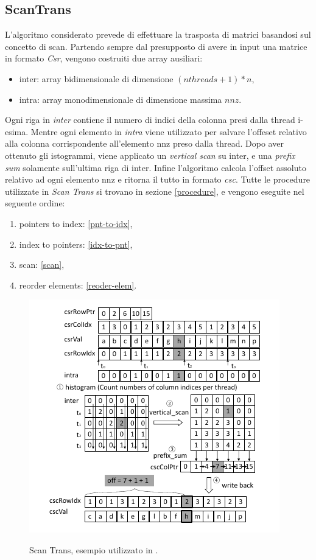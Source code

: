 \documentclass[]{IEEEtran}
\begin{document}
	\subsection{ScanTrans}
	L'algoritmo considerato prevede di effettuare la trasposta di matrici basandosi sul concetto di scan. Partendo sempre dal presupposto di avere in input una matrice in formato \textit{Csr}, vengono costruiti due array ausiliari:
	\begin{itemize}
		\item inter: array bidimensionale di dimensione $ (nthreads+1) * n $,
		\item intra: array monodimensionale di dimensione massima $ nnz $.
	\end{itemize}
	Ogni riga in \textit{inter} contiene il numero di indici della colonna presi dalla thread i-esima. Mentre ogni elemento in \textit{intra} viene utilizzato per salvare l'offeset relativo alla colonna corrispondente all'elemento nnz preso dalla thread. Dopo aver ottenuto gli istogrammi, viene applicato un \textit{vertical scan} su inter, e una \textit{prefix sum} solamente sull'ultima riga di inter. Infine l'algoritmo calcola l'offset assoluto relativo ad ogni elemento nnz e ritorna il tutto in formato \textit{csc}.\newline
	Tutte le procedure utilizzate in \textit{Scan Trans} si trovano in sezione \ref{procedure}, e vengono eseguite nel seguente ordine:
	\begin{enumerate}
		\item pointers to index: \ref{pnt-to-idx},
		\item index to pointers: \ref{idx-to-pnt},
		\item scan: \ref{scan},
		\item reorder elements: \ref{reoder-elem}.
	\end{enumerate}
	
	\begin{figure}[h!]
		\includegraphics[scale=0.8]{scantrans.png}
		\label{scantrans}
		\caption{Scan Trans, esempio utilizzato in \cite{parallelTrans}.}
	\end{figure}
	
\end{document}

